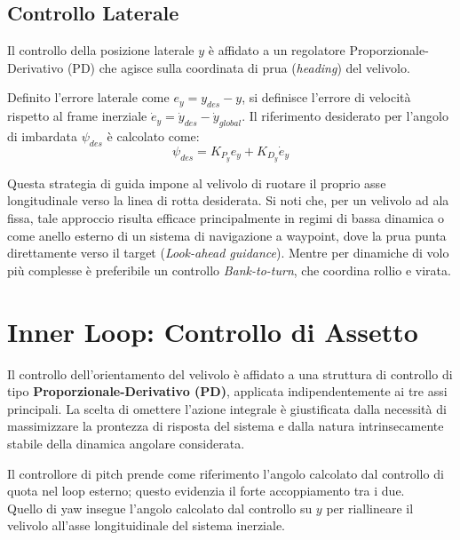 \subsection{Controllo Laterale}
Il controllo della posizione laterale $y$ è affidato a un regolatore Proporzionale-Derivativo (PD) che 
agisce sulla coordinata di prua (\textit{heading}) del velivolo. 

Definito l'errore laterale come $e_y = y_{des} - y$, si definisce l'errore di velocità rispetto al frame inerziale $\dot{e}_y = \dot{y}_{des} -\dot{y}_{global}$. Il riferimento desiderato 
per l'angolo di imbardata $\psi_{des}$ è calcolato come:
\begin{equation}
    \psi_{des} = K_{P_y} e_y + K_{D_y} \dot{e}_y
\end{equation}

Questa strategia di guida impone al velivolo di ruotare il proprio asse longitudinale verso la linea di rotta 
desiderata. Si noti che, per un velivolo ad ala fissa, tale approccio risulta efficace principalmente in regimi 
di bassa dinamica o come anello esterno di un sistema di navigazione a waypoint, dove la prua punta direttamente 
verso il target (\textit{Look-ahead guidance}). Mentre per dinamiche di volo più complesse è preferibile un controllo
\textit{Bank-to-turn}, che coordina rollio e virata.

\clearpage



\section{Inner Loop: Controllo di Assetto}

Il controllo dell'orientamento del velivolo è affidato a una struttura di controllo di tipo \textbf{Proporzionale-Derivativo (PD)}, applicata indipendentemente ai tre assi principali. La scelta di omettere l'azione integrale è giustificata dalla necessità di massimizzare la prontezza di risposta del sistema e dalla natura intrinsecamente stabile della dinamica angolare considerata.

Il controllore di pitch prende come riferimento l'angolo calcolato dal controllo di quota nel loop esterno; questo evidenzia il forte accoppiamento tra i due.
\\Quello di yaw insegue l'angolo calcolato dal controllo su $y$ per riallineare il velivolo all'asse longituidinale del sistema inerziale.

